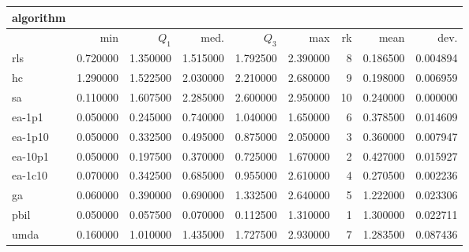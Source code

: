 \begin{tabular}{@{}l*{5}{>{{}}N{1}{2}}>{{}}N{2}{0}N{1}{3}N{1}{3}@{}}
\toprule
{algorithm} &  &  \\
\midrule
& {min} & {$Q_1$} & {med.} & {$Q_3$} & {max} & {rk} & {mean} & {dev.} \\
\midrule
rls & 0.720000 & 1.350000 & 1.515000 & 1.792500 & 2.390000 & 8 & 0.186500 & 0.004894 \\
 hc & 1.290000 & 1.522500 & 2.030000 & 2.210000 & 2.680000 & 9 & 0.198000 & 0.006959 \\
 sa & 0.110000 & 1.607500 & 2.285000 & 2.600000 & 2.950000 & 10 & 0.240000 & 0.000000 \\
 ea-1p1 & {\color{blue}} 0.050000 & 0.245000 & 0.740000 & 1.040000 & 1.650000 & 6 & 0.378500 & 0.014609 \\
 ea-1p10 & {\color{blue}} 0.050000 & 0.332500 & 0.495000 & 0.875000 & 2.050000 & 3 & 0.360000 & 0.007947 \\
 ea-10p1 & {\color{blue}} 0.050000 & 0.197500 & 0.370000 & 0.725000 & 1.670000 & 2 & 0.427000 & 0.015927 \\
 ea-1c10 & 0.070000 & 0.342500 & 0.685000 & 0.955000 & 2.610000 & 4 & 0.270500 & 0.002236 \\
 ga & 0.060000 & 0.390000 & 0.690000 & 1.332500 & 2.640000 & 5 & 1.222000 & 0.023306 \\
 pbil & {\color{blue}} 0.050000 & {\color{blue}} 0.057500 & {\color{blue}} 0.070000 & {\color{blue}} 0.112500 & {\color{blue}} 1.310000 & 1 & 1.300000 & 0.022711 \\
 umda & 0.160000 & 1.010000 & 1.435000 & 1.727500 & 2.930000 & 7 & 1.283500 & 0.087436 \\
 \bottomrule
\end{tabular}
